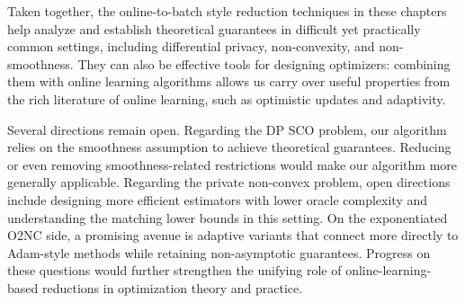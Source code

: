 Taken together, the online-to-batch style reduction techniques in these chapters help analyze and establish theoretical guarantees in difficult yet practically common settings, including differential privacy, non-convexity, and non-smoothness. They can also be effective tools for designing optimizers: combining them with online learning algorithms allows us carry over useful properties from the rich literature of online learning, such as optimistic updates and adaptivity.

Several directions remain open. Regarding the DP SCO problem, our algorithm relies on the smoothness assumption to achieve theoretical guarantees. Reducing or even removing smoothness-related restrictions would make our algorithm more generally applicable. Regarding the private non-convex problem, open directions include designing more efficient estimators with lower oracle complexity and understanding the matching lower bounds in this setting. On the exponentiated O2NC side, a promising avenue is adaptive variants that connect more directly to Adam-style methods while retaining non-asymptotic guarantees. Progress on these questions would further strengthen the unifying role of online-learning-based reductions in optimization theory and practice.
